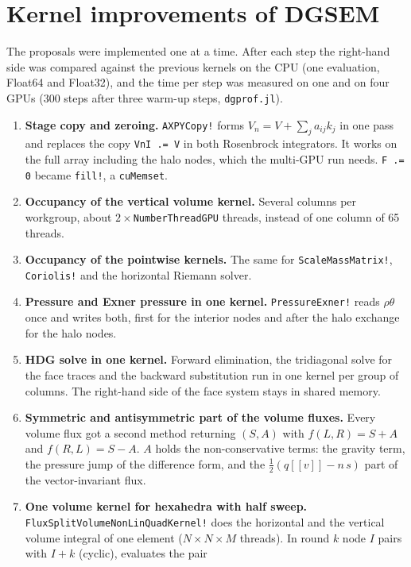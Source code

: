 \documentclass[11pt,a4paper]{article}
\newcommand{\code}[1]{\texttt{#1}}
\begin{document}
\section{Kernel improvements of DGSEM}
\label{sec:kernels}

The proposals were implemented one at a time. After each step the
right-hand side was compared against the previous kernels on the CPU
(one evaluation, Float64 and Float32), and the time per step was measured
on one and on four GPUs (300 steps after three warm-up steps,
\code{dgprof.jl}).

\begin{enumerate}
\item \textbf{Stage copy and zeroing.} \code{AXPYCopy!} forms
  $V_n = V + \sum_j a_{ij}k_j$ in one pass and replaces the copy
  \code{VnI .= V} in both Rosenbrock integrators. It works on the full
  array including the halo nodes, which the multi-GPU run needs.
  \code{F .= 0} became \code{fill!}, a \code{cuMemset}.
\item \textbf{Occupancy of the vertical volume kernel.} Several columns per
  workgroup, about $2\times$\code{NumberThreadGPU} threads, instead of one
  column of 65 threads.
\item \textbf{Occupancy of the pointwise kernels.} The same for
  \code{ScaleMassMatrix!}, \code{Coriolis!} and the horizontal Riemann
  solver.
\item \textbf{Pressure and Exner pressure in one kernel.}
  \code{PressureExner!} reads $\rho\theta$ once and writes both, first for
  the interior nodes and after the halo exchange for the halo nodes.
\item \textbf{HDG solve in one kernel.} Forward elimination, the
  tridiagonal solve for the face traces and the backward substitution run
  in one kernel per group of columns. The right-hand side of the face
  system stays in shared memory.
\item \textbf{Symmetric and antisymmetric part of the volume fluxes.}
  Every volume flux got a second method returning $(S,A)$ with
  $f(L,R)=S+A$ and $f(R,L)=S-A$. $A$ holds the non-conservative terms:
  the gravity term, the pressure jump of the difference form, and the
  $\frac12(q[\![v]\!]-n\,s)$ part of the vector-invariant flux.
\item \textbf{One volume kernel for hexahedra with half sweep.}
  \code{FluxSplitVolumeNonLinQuadKernel!} does the horizontal and the
  vertical volume integral of one element ($N\times N\times M$ threads).
  In round $k$ node $I$ pairs with $I+k$ (cyclic), evaluates the pair

\end{enumerate}
\end{document}

